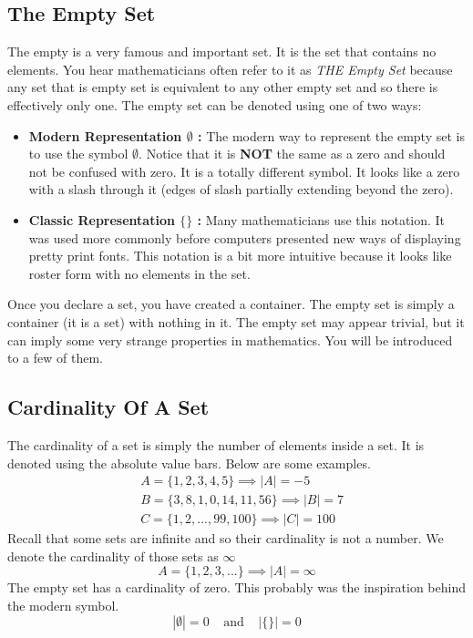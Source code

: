 \subsection*{The Empty Set}
The empty is a very famous and important set.  It is the set that contains no elements.  You hear mathematicians often refer to it as \emph{THE Empty Set} because any set that is empty set is equivalent to any other empty set and so there is effectively only one.  The empty set can be denoted using one of two ways:
\begin{itemize}
    \item \textbf{Modern Representation $\emptyset$ : }  The modern way to represent the empty set is to use the symbol $\emptyset$.  Notice that it is \textbf{NOT} the same as a zero and should not be confused with zero.  It is a totally different symbol. It looks like a zero with a slash through it (edges of slash partially extending beyond the zero).
    \item \textbf{Classic Representation $\{\}$ :} Many mathematicians use this notation.  It was used more commonly before computers presented new ways of displaying pretty print fonts.  This notation is a bit more intuitive because it looks like roster form with no elements in the set.
\end{itemize}
Once you declare a set, you have created a container.  The empty set is simply a container (it is a set) with nothing in it.  The empty set may appear trivial, but it can imply some very strange properties in mathematics. You will be introduced to a few of them.

\subsection*{Cardinality Of A Set}
The cardinality of a set is simply the number of elements inside a set.  It is denoted using the absolute value bars.  Below are some examples.
\begin{align*}
    &A = \{1,2,3,4,5\} \implies |A| =- 5 \\
    &B = \{3,8,1,0,14,11,56 \} \implies |B| = 7\\
    &C = \{1,2,...,99,100\} \implies |C|=100
\end{align*}
Recall that some sets are infinite and so their cardinality is not a number.  We denote the cardinality of those sets as $\infty$
$$A = \{1,2,3,...\} \implies |A| = \infty$$
The empty set has a cardinality of zero.  This probably was the inspiration behind the modern symbol.
$$|\emptyset| = 0 \;\;\;\; \text{and} \;\;\;\;|\{\}| = 0$$

